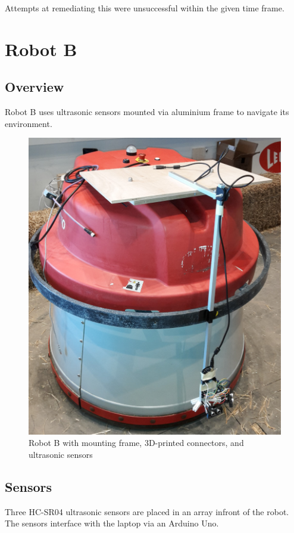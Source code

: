 \documentclass[11pt]{article}
\begin{document}
	Attempts at remediating this were unsuccessful within the given time frame.
	
	\pagebreak

	\section{Robot B}
	
	\subsection{Overview}
	Robot B uses ultrasonic sensors mounted via aluminium frame to navigate its environment.
	
	\begin{figure}[h!]
		\centering
		\includegraphics[scale=0.1]{robot_b_full}
		\caption{Robot B with mounting frame, 3D-printed connectors, and ultrasonic sensors}
	\end{figure}
	
	\subsection{Sensors}
	Three HC-SR04 ultrasonic sensors are placed in an array infront of the robot. The sensors interface with the laptop via an Arduino Uno. \newline
	
\end{document}

